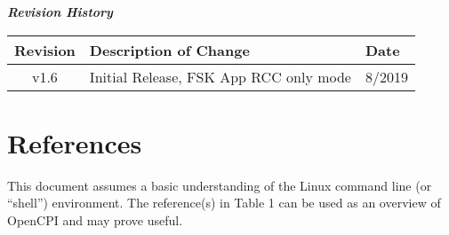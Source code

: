	\begin{center}
	\textit{\textbf{Revision History}}
		\begin{table}[H]
		\label{table:revisions} %
			\begin{tabularx}{\textwidth}{|c|X|l|}
			\hline
			\rowcolor{blue}
			\textbf{Revision} & \textbf{Description of Change} & \textbf{Date} \\
		    \hline
		    v1.6 & Initial Release, FSK App RCC only mode & 8/2019 \\
			\hline
			\end{tabularx}
		\end{table}
	\end{center}

\newpage

\tableofcontents

\newpage

\section{References}

	This document assumes a basic understanding of the Linux command line (or ``shell'') environment.  The reference(s) in Table 1 can be used as an overview of OpenCPI and may prove useful.

\def\myreferences{
\hline
FSK App Guide\footnote{Provides details of the ``FSK App'' reference application used in this document} & \githubioFlat{assets/FSK\_app.pdf} \\
\hline
FSK App Getting Started Guide & \githubioFlat{assets/FSK\_App\_RCC\_Getting\_Started\_Guide.pdf} \\
}


